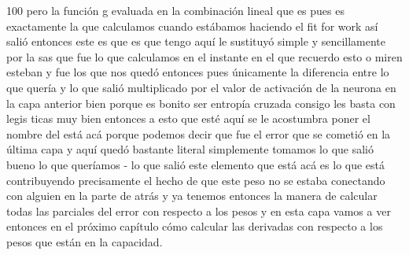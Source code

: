 100 pero la función g evaluada en la combinación lineal que es pues es exactamente la que calculamos cuando estábamos haciendo el fit for work así salió entonces este es que es que tengo aquí le sustituyó simple y sencillamente por la sas que fue lo que calculamos en el instante en el que recuerdo esto o miren esteban y fue los que nos quedó entonces pues únicamente la diferencia entre lo que quería y lo que salió multiplicado por el valor de activación de la neurona en la capa anterior bien porque es bonito ser entropía cruzada consigo les basta con legis ticas muy bien entonces a esto que esté aquí se le acostumbra poner el nombre del está acá porque podemos decir que fue el error que se cometió en la última capa y aquí quedó bastante literal simplemente tomamos lo que salió bueno lo que queríamos - lo que salió este elemento que está acá es lo que está contribuyendo precisamente el hecho de que este peso no se estaba conectando con alguien en la parte de atrás y ya tenemos entonces la manera de calcular todas las parciales del error con respecto a los pesos y en esta capa vamos a ver entonces en el próximo capítulo cómo calcular las derivadas con respecto a los pesos que están en la capacidad.
